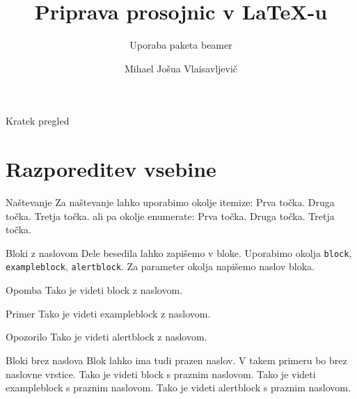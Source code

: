 \documentclass{beamer}
\begin{document}

\title{Priprava prosojnic v LaTeX-u}
\subtitle{Uporaba paketa beamer}
\author{Mihael Jošua Vlaisavljevič}


   \begin{frame}{Kratek pregled}
\tableofcontents[pausesections]
   \end{frame}

\section{Razporeditev vsebine}


   \begin{frame}{Naštevanje}
   Za naštevanje lahko uporabimo okolje itemize:
      Prva točka.
      Druga točka.
      Tretja točka.
   ali pa okolje enumerate:
      Prva točka.
      Druga točka.
      Tretja točka.
   \end{frame}

   \begin{frame}{Bloki z naslovom}
   Dele besedila lahko zapišemo v bloke.
   Uporabimo okolja \texttt{block}, \texttt{exampleblock}, \texttt{alertblock}.
   Za parameter okolja napišemo naslov bloka.
   \begin{block}{Opomba}
      Tako je videti block z naslovom.
   \end{block}
   \begin{exampleblock}{Primer}
      Tako je videti exampleblock z naslovom.
   \end{exampleblock}
   \begin{alertblock}{Opozorilo}
      Tako je videti alertblock z naslovom.
   \end{alertblock}
\end{frame}

   Bloki brez naslova
   Blok lahko ima tudi prazen naslov.
   V takem primeru bo brez naslovne vrstice.
      Tako je videti block s praznim naslovom.
      Tako je videti exampleblock s praznim naslovom.
      Tako je videti alertblock s praznim naslovom.
\end{document}
